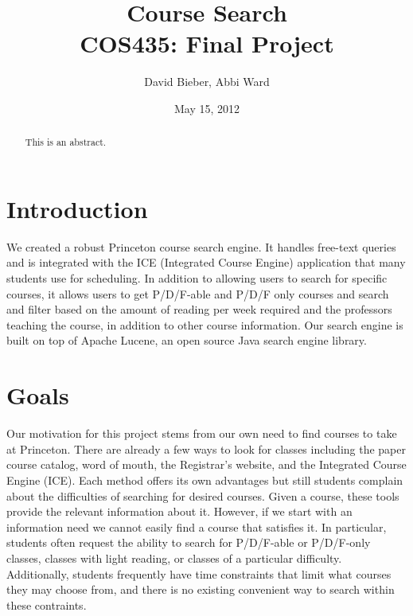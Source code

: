 \documentclass[12pt,letterpaper]{article}
\begin{document}
\title{Course Search \\ \large{COS435: Final Project}}
\author{David Bieber, Abbi Ward}
\date{May 15, 2012}

\begin{titlepage}
\maketitle
\end{titlepage}


\begin{abstract}
This is an abstract.
\end{abstract}

\section{Introduction}
We created a robust Princeton course search engine. It handles free-text queries and is integrated with the ICE (Integrated Course Engine) application that many students use for scheduling. In addition to allowing users to search for specific courses, it allows users to get P/D/F-able and P/D/F only courses and search and filter based on the amount of reading per week required and the professors teaching the course, in addition to other course information. Our search engine is built on top of Apache Lucene, an open source Java search engine library.


\section{Goals}
Our motivation for this project stems from our own need to find courses to take at Princeton. There are already a few ways to look for classes including the paper course catalog, word of mouth, the Registrar's website, and the Integrated Course Engine (ICE). Each method offers its own advantages but still students complain about the difficulties of searching for desired courses. Given a course, these tools provide the relevant information about it. However, if we start with an information need we cannot easily find a course that satisfies it. In particular, students often request the ability to search for P/D/F-able or P/D/F-only classes, classes with light reading, or classes of a particular difficulty. Additionally, students frequently have time constraints that limit what courses they may choose from, and there is no existing convenient way to search within these contraints.
	
\end{document}
